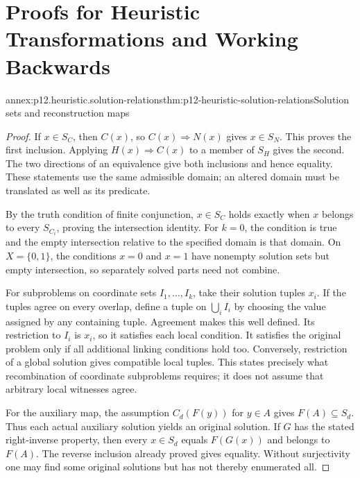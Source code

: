 \chapter{Proofs for Heuristic Transformations and Working Backwards}
\label{annex:p12-heuristic-transformations-and-backward-reasoning}

\begin{annexitem}{annex:p12.heuristic.solution-relations}{thm:p12-heuristic-solution-relations}{Solution sets and reconstruction maps}
\begin{proof}
If \(x\in S_C\), then \(C(x)\), so \(C(x)\Rightarrow N(x)\)
gives \(x\in S_N\). This proves the first inclusion. Applying
\(H(x)\Rightarrow C(x)\) to a member of \(S_H\) gives the
second. The two directions of an equivalence give both inclusions
and hence equality. These statements use the same admissible domain;
an altered domain must be translated as well as its predicate.

By the truth condition of finite conjunction,
\(x\in S_C\) holds exactly when \(x\) belongs to every
\(S_{C_i}\), proving the intersection identity. For \(k=0\),
the condition is true and the empty intersection relative to the
specified domain is that domain. On \(X=\{0,1\}\), the
conditions \(x=0\) and \(x=1\) have nonempty solution sets
but empty intersection, so separately solved parts need not combine.

For subproblems on coordinate sets \(I_1,\ldots,I_k\), take
their solution tuples \(x_i\). If the tuples agree on every
overlap, define a tuple on \(\bigcup_i I_i\) by choosing the
value assigned by any containing tuple. Agreement makes this
well defined. Its restriction to \(I_i\) is \(x_i\), so it
satisfies each local condition. It satisfies the original problem
only if all additional linking conditions hold too. Conversely,
restriction of a global solution gives compatible local tuples.
This states precisely what recombination of coordinate subproblems
requires; it does not assume that arbitrary local witnesses agree.

For the auxiliary map, the assumption \(C_d(F(y))\) for
\(y\in A\) gives \(F(A)\subseteq S_d\). Thus each actual
auxiliary solution yields an original solution. If \(G\) has
the stated right-inverse property, then every \(x\in S_d\)
equals \(F(G(x))\) and belongs to \(F(A)\). The reverse
inclusion already proved gives equality. Without surjectivity
one may find some original solutions but has not thereby enumerated all.
\end{proof}
\end{annexitem}

